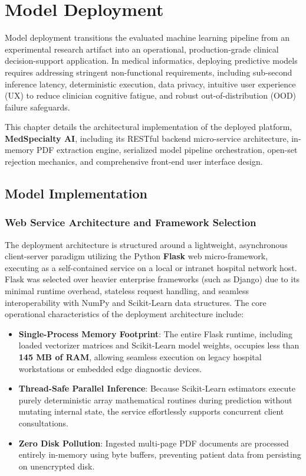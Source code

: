 \clearpage

\section{Model Deployment}

Model deployment transitions the evaluated machine learning pipeline from an experimental research artifact into an operational, production-grade clinical decision-support application. In medical informatics, deploying predictive models requires addressing stringent non-functional requirements, including sub-second inference latency, deterministic execution, data privacy, intuitive user experience (UX) to reduce clinician cognitive fatigue, and robust out-of-distribution (OOD) failure safeguards.

This chapter details the architectural implementation of the deployed platform, \textbf{MedSpecialty AI}, including its RESTful backend micro-service architecture, in-memory PDF extraction engine, serialized model pipeline orchestration, open-set rejection mechanics, and comprehensive front-end user interface design.

\subsection{Model Implementation}

\subsubsection{Web Service Architecture and Framework Selection}

The deployment architecture is structured around a lightweight, asynchronous client-server paradigm utilizing the Python \textbf{Flask} web micro-framework, executing as a self-contained service on a local or intranet hospital network host. Flask was selected over heavier enterprise frameworks (such as Django) due to its minimal runtime overhead, stateless request handling, and seamless interoperability with NumPy and Scikit-Learn data structures. The core operational characteristics of the deployment architecture include:
\begin{itemize}
    \item \textbf{Single-Process Memory Footprint}: The entire Flask runtime, including loaded vectorizer matrices and Scikit-Learn model weights, occupies less than \textbf{145 MB of RAM}, allowing seamless execution on legacy hospital workstations or embedded edge diagnostic devices.
    \item \textbf{Thread-Safe Parallel Inference}: Because Scikit-Learn estimators execute purely deterministic array mathematical routines during prediction without mutating internal state, the service effortlessly supports concurrent client consultations.
    \item \textbf{Zero Disk Pollution}: Ingested multi-page PDF documents are processed entirely in-memory using byte buffers, preventing patient data from persisting on unencrypted disk.
\end{itemize}

